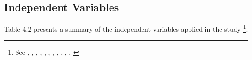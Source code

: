 \documentclass[a4paper, nobind]{templates/ociamthesis}
\begin{document}
\hypertarget{independent-variables}{%
\subsection{Independent Variables}\label{independent-variables}}

Table 4.2 presents a summary of the independent variables applied in the study \footnote{See \textcite{jensen1976theory}, \textcite{titman1988determinants}, \textcite{ledgerwood1998microfinance}, \textcite{kyereboah2007determinants}, \textcite{kraay2010worldwide}, \textcite{allen2014african}, \textcite{kurshev2015firm}, \textcite{bayai2016financing}, \textcite{schnyder2018twenty}, \textcite{kimmel2018financial}, \textcite{ito2018quantity}, \textcite{market2018global}}.

\begin{table}


\end{table}
\end{document}
